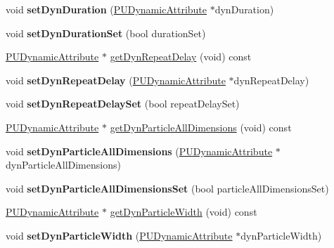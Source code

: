 \begin{DoxyCompactItemize}
\mbox{\label{classPUEmitter_a4165cc4319f111235e860ef4d59423b2}} 
void {\bfseries set\+Dyn\+Duration} (\hyperlink{classPUDynamicAttribute}{P\+U\+Dynamic\+Attribute} $\ast$dyn\+Duration)
\item 
\mbox{\label{classPUEmitter_ac270698dbad1b6d1ae466d694f943441}} 
void {\bfseries set\+Dyn\+Duration\+Set} (bool duration\+Set)
\item 
\hyperlink{classPUDynamicAttribute}{P\+U\+Dynamic\+Attribute} $\ast$ \hyperlink{classPUEmitter_a72ef4ad6d5eedc9508b554c76d7870d7}{get\+Dyn\+Repeat\+Delay} (void) const
\item 
\mbox{\label{classPUEmitter_a2d9b7d6ca7a184e30bdd48f5792b789d}} 
void {\bfseries set\+Dyn\+Repeat\+Delay} (\hyperlink{classPUDynamicAttribute}{P\+U\+Dynamic\+Attribute} $\ast$dyn\+Repeat\+Delay)
\item 
\mbox{\label{classPUEmitter_a81fecb4e7a2134b3aeff21c99edca836}} 
void {\bfseries set\+Dyn\+Repeat\+Delay\+Set} (bool repeat\+Delay\+Set)
\item 
\hyperlink{classPUDynamicAttribute}{P\+U\+Dynamic\+Attribute} $\ast$ \hyperlink{classPUEmitter_a10a6dc6fb4deb3a167b09195f323d57b}{get\+Dyn\+Particle\+All\+Dimensions} (void) const
\item 
\mbox{\label{classPUEmitter_aec948d85bfa4464756c9d8b8fb2e2d9e}} 
void {\bfseries set\+Dyn\+Particle\+All\+Dimensions} (\hyperlink{classPUDynamicAttribute}{P\+U\+Dynamic\+Attribute} $\ast$dyn\+Particle\+All\+Dimensions)
\item 
\mbox{\label{classPUEmitter_a7b31b4e740fe69282c184efe7a910193}} 
void {\bfseries set\+Dyn\+Particle\+All\+Dimensions\+Set} (bool particle\+All\+Dimensions\+Set)
\item 
\hyperlink{classPUDynamicAttribute}{P\+U\+Dynamic\+Attribute} $\ast$ \hyperlink{classPUEmitter_a88dbac81e6621814124727767a79434f}{get\+Dyn\+Particle\+Width} (void) const
\item 
\mbox{\label{classPUEmitter_a405fb78092643f57496e8fabdd9d0c5d}} 
void {\bfseries set\+Dyn\+Particle\+Width} (\hyperlink{classPUDynamicAttribute}{P\+U\+Dynamic\+Attribute} $\ast$dyn\+Particle\+Width)
\item 

\end{DoxyCompactItemize}
